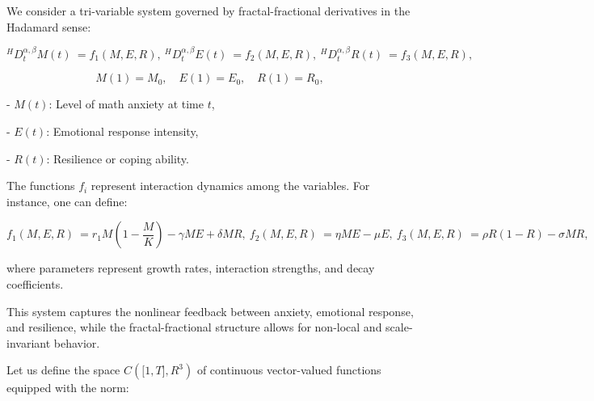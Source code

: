 \documentclass[10pt]{NSP1}
\begin{document}
\par\medskip{}\smallskip

We consider a tri-variable system governed by fractal-fractional derivatives in the Hadamard sense:

\[
^{H}D_{t}^{\alpha,\beta}M(t)\ = f_{1}(M,E,R),\ ^{H}D_{t}^{\alpha,\beta}E(t)\ = f_{2}(M,E,R),\ ^{H}D_{t}^{\alpha,\beta}R(t)\ = f_{3}(M,E,R),\
\]

\par\vspace{9.0pt}\vspace{9.0pt}

\[
M(1) = M_{0},\quad E(1) = E_{0},\quad R(1) = R_{0},
\]

\par\vspace{9.0pt}\vspace{9.0pt}

- \(M(t)\): Level of math anxiety at time \(t\),

- \(E(t)\): Emotional response intensity,

- \(R(t)\): Resilience or coping ability.

The functions \(f_{i}\) represent interaction dynamics among the variables. For instance, one can define:

\[
f_{1}(M,E,R)\ = r_{1}M\left( 1 - \frac{M}{K} \right) - \gamma ME + \delta MR,\ f_{2}(M,E,R)\ = \eta ME - \mu E,\ f_{3}(M,E,R)\ = \rho R(1 - R) - \sigma MR,\
\]

where parameters represent growth rates, interaction strengths, and decay coefficients.

This system captures the nonlinear feedback between anxiety, emotional response, and resilience, while the fractal-fractional structure allows for non-local and scale-invariant behavior.

\par\medskip\noindent {\large\bfseries 3. Qualitative Analysis\par}\smallskip

\par\medskip{}\smallskip

Let us define the space \(C\left( \lbrack 1,T\rbrack,R^{3} \right)\) of continuous vector-valued functions equipped with the norm:
\end{document}
